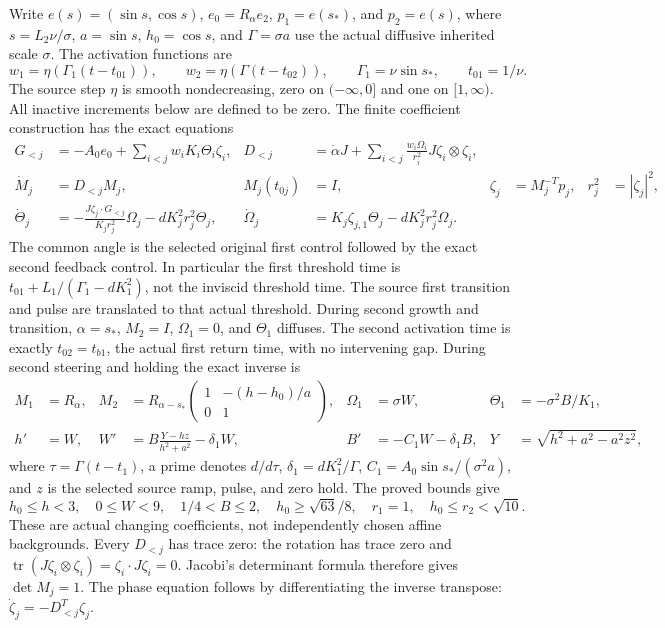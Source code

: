 Write $e(s)=(\sin s,\cos s)$, $e_0=R_\alpha e_2$,
$p_1=e(s_*)$, and $p_2=e(s)$, where
$s=L_2\nu/\sigma$, $a=\sin s$, $h_0=\cos s$, and
$\Gamma=\sigma a$ use the actual diffusive inherited scale $\sigma$.
The activation functions are
\[
 w_1=\eta(\Gamma_1(t-t_{01})),\qquad
 w_2=\eta(\Gamma(t-t_{02})),\qquad
 \Gamma_1=\nu\sin s_*,\qquad t_{01}=1/\nu.
\]
The source step $\eta$ is smooth nondecreasing, zero on
$(-\infty,0]$ and one on $[1,\infty)$.
All inactive increments below are defined to be zero. The finite
coefficient construction has the exact equations
\begin{align}
 G_{<j}&=-A_0e_0+\sum_{i<j}w_iK_i\Theta_i\zeta_i,
 &D_{<j}&=\dot\alpha J+
       \sum_{i<j}\frac{w_i\Omega_i}{r_i^2}J\zeta_i\otimes\zeta_i,
 \label{cvlane:ms:parents}\\
 \dot M_j&=D_{<j}M_j,&M_j(t_{0j})&=I,
 &\zeta_j&=M_j^{-T}p_j,&r_j^2&=|\zeta_j|^2,\nonumber\\
 \dot\Theta_j&=-\frac{J\zeta_j\cdot G_{<j}}{K_jr_j^2}\Omega_j
                   -dK_j^2r_j^2\Theta_j,
 &\dot\Omega_j&=K_j\zeta_{j,1}\Theta_j-dK_j^2r_j^2\Omega_j.
 \label{cvlane:ms:amplitudes}
\end{align}
The common angle is the selected original first control followed by
the exact second feedback control. In particular the first threshold
time is $t_{01}+L_1/(\Gamma_1-dK_1^2)$, not the inviscid
threshold time. The source first transition and pulse are translated
to that actual threshold. During second growth and transition,
$\alpha=s_*$, $M_2=I$, $\Omega_1=0$, and $\Theta_1$ diffuses.
The second activation time is exactly $t_{02}=t_{b1}$, the actual
first return time, with no intervening gap.
During second steering and holding the exact inverse is
\begin{align}
 M_1&=R_\alpha,&
 M_2&=R_{\alpha-s_*}
       \begin{pmatrix}1&-(h-h_0)/a\\0&1\end{pmatrix},
 &\Omega_1&=\sigma W,&\Theta_1&=-\sigma^2B/K_1,
 \label{cvlane:ms:M}\\
 h'&=W,&
 W'&=B\frac{Y-hz}{h^2+a^2}-\delta_1W,&
 B'&=-C_1W-\delta_1B,&
 Y&=\sqrt{h^2+a^2-a^2z^2},\nonumber
\end{align}
where $\tau=\Gamma(t-t_1)$, a prime denotes $d/d\tau$,
$\delta_1=dK_1^2/\Gamma$,
$C_1=A_0\sin s_*/(\sigma^2a)$, and $z$ is the selected
source ramp, pulse, and zero hold. The proved bounds give
\[
 h_0\leq h<3,\quad 0\leq W<9,\quad
 1/4<B\leq2,\quad h_0\geq\sqrt{63}/8,\quad
 r_1=1,\quad h_0\leq r_2<\sqrt{10}.
\]
These are actual changing coefficients, not independently chosen
affine backgrounds. Every $D_{<j}$ has trace zero: the rotation
has trace zero and
$\operatorname{tr}(J\zeta_i\otimes\zeta_i)=\zeta_i\cdot J\zeta_i=0$.
Jacobi's determinant formula therefore gives $\det M_j=1$.
The phase equation follows by differentiating the inverse transpose:
$\dot\zeta_j=-D_{<j}^T\zeta_j$.

